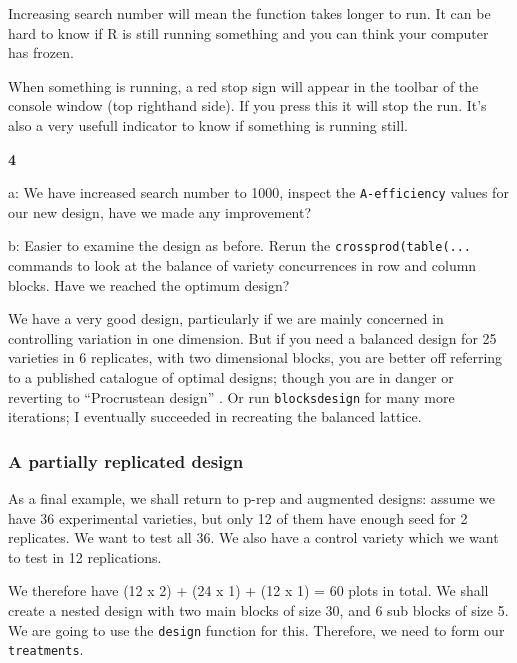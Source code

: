 \documentclass[
]{book}
\makeatletter
\newenvironment{kframe}{%
\medskip{}
\setlength{\fboxsep}{.8em}
 \def\at@end@of@kframe{}%
 \ifinner\ifhmode%
  \def\at@end@of@kframe{\end{minipage}}%
  \begin{minipage}{\columnwidth}%
 \fi\fi%
 \def\FrameCommand##1{\hskip\@totalleftmargin \hskip-\fboxsep
 \colorbox{shadecolor}{##1}\hskip-\fboxsep
     \hskip-\linewidth \hskip-\@totalleftmargin \hskip\columnwidth}%
 \MakeFramed {\advance\hsize-\width
   \@totalleftmargin\z@ \linewidth\hsize
   \@setminipage}}%
 {\par\unskip\endMakeFramed%
 \at@end@of@kframe}
\newenvironment{rmdblock}[1]
  {
  \begin{itemize}
  \renewcommand{\labelitemi}{
    \raisebox{-.7\height}[0pt][0pt]{
      {\setkeys{Gin}{width=3em,keepaspectratio}\texttt{[image: images/\#1]}}
    }
  }
  \setlength{\fboxsep}{1em}
  \begin{kframe}
  \item
  }
  {
  \end{kframe}
  \end{itemize}
  }
\newenvironment{rmdnote}
  {\begin{rmdblock}{note}}
  {\end{rmdblock}}
\newenvironment{rmdquiz}
  {\begin{rmdblock}{quiz}}
  {\end{rmdblock}}
\makeatother
\begin{document}
\begin{rmdnote}
Increasing search number will mean the function takes longer to run. It can be hard to know if R is still running something and you can think your computer has frozen.

When something is running, a red stop sign will appear in the toolbar of the console window (top righthand side). If you press this it will stop the run. It's also a very usefull indicator to know if something is running still.
\end{rmdnote}

\begin{rmdquiz}
\textbf{4}

a: We have increased search number to 1000, inspect the \texttt{A-efficiency} values for our new design, have we made any improvement?

b: Easier to examine the design as before. Rerun the \texttt{crossprod(table(...} commands to look at the balance of variety concurrences in row and column blocks. Have we reached the optimum design?
\end{rmdquiz}

We have a very good design, particularly if we are mainly concerned in controlling variation in one dimension. But if you need a balanced design for 25 varieties in 6 replicates, with two dimensional blocks, you are better off referring to a published catalogue of optimal designs; though you are in danger or reverting to ``Procrustean design'' \citep{mead_design_1994}. Or run \texttt{blocksdesign} for many more iterations; I eventually succeeded in recreating the balanced lattice.

\hypertarget{a-partially-replicated-design}{%
\subsubsection{A partially replicated design}\label{a-partially-replicated-design}}

As a final example, we shall return to p-rep and augmented designs: assume we have 36 experimental varieties, but only 12 of them have enough seed for 2 replicates. We want to test all 36. We also have a control variety which we want to test in 12 replications.

We therefore have (12 x 2) + (24 x 1) + (12 x 1) = 60 plots in total. We shall create a nested design with two main blocks of size 30, and 6 sub blocks of size 5.
We are going to use the \texttt{design} function for this. Therefore, we need to form our \texttt{treatments}.
\end{document}
